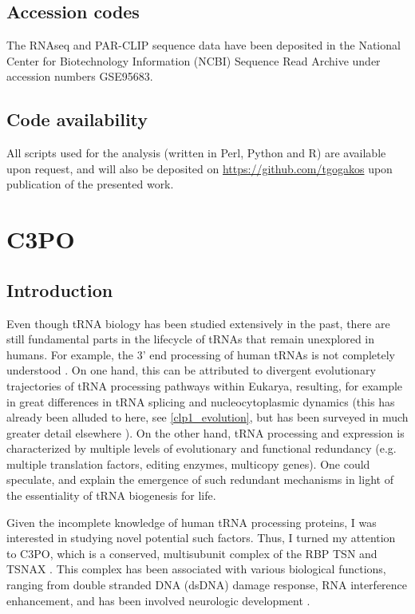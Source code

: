 \documentclass[12pt]{rockefeller}
\begin{document}
\section{Accession codes}
The RNAseq and PAR-CLIP sequence data have been deposited in the National Center for Biotechnology Information (NCBI) Sequence Read Archive under accession numbers GSE95683.

\section{Code availability}
All scripts used for the analysis (written in Perl, Python and R) are available upon request, and will also be deposited on \url{https://github.com/tgogakos} upon publication of the presented work.  

\chapter{C3PO}
\section{Introduction}
Even though tRNA biology has been studied extensively in the past, there are still fundamental parts in the lifecycle of tRNAs that remain unexplored in humans. For example, the 3' end processing of human tRNAs is not completely understood \cite{Maraia:2010kx}. On one hand, this can be attributed to divergent evolutionary trajectories of tRNA processing pathways within Eukarya, resulting, for example in great differences in tRNA splicing and nucleocytoplasmic dynamics (this has already been alluded to here, see \ref{clp1_evolution}, but has been surveyed in much greater detail elsewhere \cite{Hopper:2008ct, Hopper:2010ho, Phizicky:2010jf}). On the other hand, tRNA processing and expression is characterized by multiple levels of evolutionary and functional redundancy (e.g. multiple translation factors, editing enzymes, multicopy genes). One could speculate, and explain the emergence of such redundant mechanisms in light of the essentiality of tRNA biogenesis for life. 

Given the incomplete knowledge of human tRNA processing proteins, I was interested in studying novel potential such factors. Thus, I turned my attention to \gls{C3PO}, which is a conserved, multisubunit complex of the RBP \gls{TSN} and \gls{TSNAX} \cite{Liu:2009ce}. This complex has been associated with various biological functions, ranging from double stranded DNA (dsDNA) damage response, RNA interference enhancement, and has been involved neurologic development \cite{Aoki:1995ec, Ishida:2002td, Stein:2006jj, Claussen:2006in, Liu:2009ce}. 
	
\end{document}
